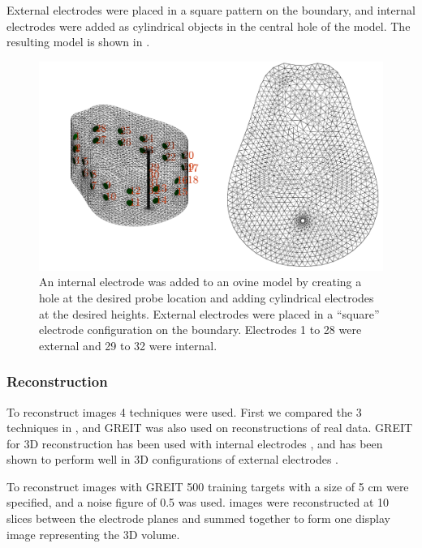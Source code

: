 External electrodes were placed in a square pattern on the boundary, and internal
electrodes were added as cylindrical objects in the central hole of the model.
The resulting model is shown in .

\begin{figure}[H]
    \centering
	\includegraphics[width=\textwidth]{chapter7-internal_elec_motion/imgs/lamb_model.pdf} 
	\caption[Ovine model with internal probe]{\label{fig:internal_lamb_model} 
	An internal electrode was added to an ovine model by creating a hole at the desired probe
	location and adding cylindrical electrodes at the desired heights. External electrodes
	were placed in a ``square'' electrode configuration on the boundary. Electrodes 1 to 28 were 
	external and 29 to 32 were internal.}
\end{figure}

\subsubsection{Reconstruction}
To reconstruct images 4 techniques were used. First we compared the 3
techniques in , and GREIT was also used on reconstructions 
of real data.
GREIT for 3D reconstruction has been used with internal electrodes 
\parencite{nasehi_tehrani_evaluation_2012,nasehi_tehrani_modelling_2012}, 
and has been shown to perform well in 3D configurations of external electrodes
\parencite{grychtol_3d_2016}.

To reconstruct images with GREIT 500 training targets with a size of 5 cm were specified, and a noise figure
of 0.5 was used.
images were reconstructed at 10 slices between the electrode planes and summed together to form one 
display image representing the 3D volume.

